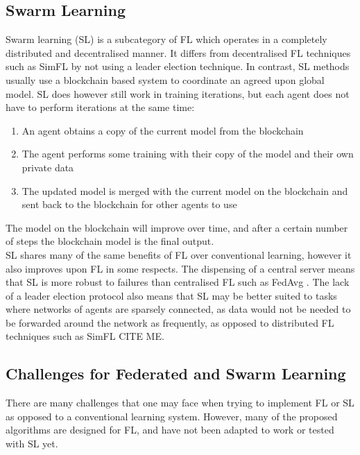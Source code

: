 \subsection{Swarm Learning}
Swarm learning (SL) \cite{swarm_learning} is a subcategory of FL which operates in a completely distributed and decentralised manner. It differs from decentralised FL techniques such as SimFL \cite{simfl} by not using a leader election technique. In contrast, SL methods usually use a blockchain based system to coordinate an agreed upon global model. SL does however still work in training iterations, but each agent does not have to perform iterations at the same time:
\begin{enumerate}
	\item An agent obtains a copy of the current model from the blockchain
	\item The agent performs some training with their copy of the model and their own private data
	\item The updated model is merged with the current model on the blockchain and sent back to the blockchain for other agents to use
\end{enumerate}
The model on the blockchain will improve over time, and after a certain number of steps the blockchain model is the final output. \\

SL shares many of the same benefits of FL over conventional learning, however it also improves upon FL in some respects. The dispensing of a central server means that SL is more robust to failures than centralised FL such as FedAvg \cite{fed_learning}. The lack of a leader election protocol also means that SL may be better suited to tasks where networks of agents are sparsely connected, as data would not be needed to be forwarded around the network as frequently, as opposed to distributed FL techniques such as SimFL \cite{simfl} CITE ME.

\subsection{Challenges for Federated and Swarm Learning}
There are many challenges that one may face when trying to implement FL or SL as opposed to a conventional learning system. However, many of the proposed algorithms are designed for FL, and have not been adapted to work or tested with SL yet.

